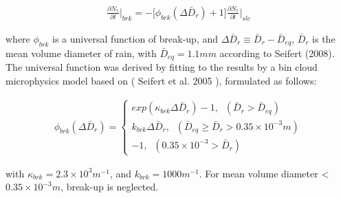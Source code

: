 \begin{eqnarray}
\frac{\partial N_{r}}{\partial t}\Bigr|_{brk}=-\bigl[\phi_{brk}(\Delta \bar{D}_{r})+1\bigr]\frac{\partial N_{r}}{\partial t}\Bigr|_{slc}\label{sn154}
\end{eqnarray}

where $\phi_{brk}$ is a universal function of break-up, and $\Delta \bar{D}_{r}\equiv \bar{D}_{r}-\bar{D}_{eq}$, $\bar{D}_{r}$ is the mean volume diameter of rain, with $\bar{D}_{eq} = 1.1 mm$ according to Seifert (2008). The universal function was derived by fitting to the results by a bin cloud microphysics model based on ( Seifert et al. 2005 ), formulated as follows:

\begin{eqnarray}
\phi_{brk}(\Delta\bar{D}_{r})=
\left\{
\begin{array}{l}
exp(\kappa_{brk}\Delta\bar{D}_{r})-1,\;\;(\bar{D}_{r}>\bar{D}_{eq}) \\
k_{brk}\Delta\bar{D}_{r},\;\;(\bar{D}_{eq}\geq \bar{D}_{r}>0.35\times 10^{-3}m) \\
-1,\;\;(0.35\times10^{-3}>\bar{D}_{r})
\label{sn155}
\end{array}
\right.
\end{eqnarray}

with $\kappa_{brk} = 2.3 \times 10^{3} m^{-1}$, and $k_{brk} = 1000 m^{-1}$. For mean volume diameter < $0.35 \times 10^{-3}m$, break-up is neglected.

